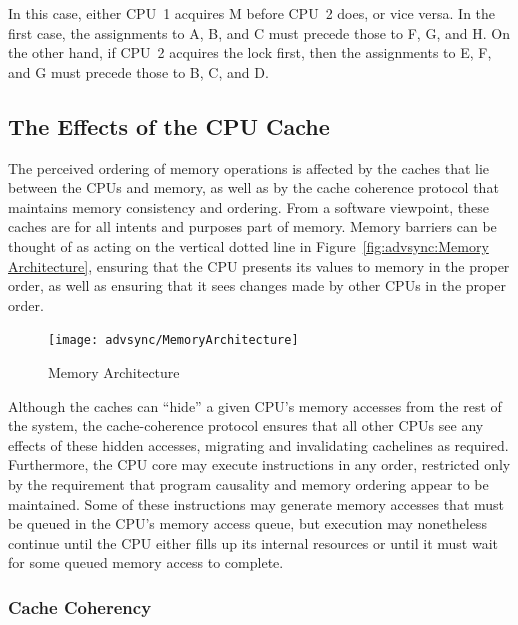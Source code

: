 \begin{enumerate}
In this case, either CPU~1 acquires M before CPU~2 does, or vice versa.
In the first case, the assignments to A, B, and C must precede
those to F, G, and H.
On the other hand, if CPU~2 acquires the lock first, then the
assignments to E, F, and G must precede those to B, C, and D.
\fi

\subsection{The Effects of the CPU Cache}
\label{sec:advsync:The Effects of the CPU Cache}

The perceived ordering of memory operations is affected by the caches
that lie between the CPUs and memory, as well as by the cache coherence
protocol that maintains memory consistency and ordering.
From a software viewpoint, these caches are for all intents and purposes
part of memory.
Memory barriers can be thought of as acting on the vertical dotted line in
Figure~\ref{fig:advsync:Memory Architecture}, ensuring that the CPU
presents its values to memory in the proper order, as well as ensuring
that it sees changes made by other CPUs in the proper order.

\begin{figure}[htb]
\begin{center}
\texttt{[image: advsync/MemoryArchitecture]}
\end{center}
\caption{Memory Architecture}
\end{figure}

Although the caches can ``hide'' a given CPU's memory accesses from the rest of
the system, the cache-coherence protocol ensures that all other CPUs see
any effects of these hidden accesses, migrating and invalidating cachelines
as required.
Furthermore, the CPU core may execute instructions in any order, restricted
only by the requirement that program causality and memory ordering
appear to be maintained.
Some of these instructions may generate memory accesses that must be queued
in the CPU's memory access queue, but execution may nonetheless continue
until the CPU either fills up its internal resources or until it must
wait for some queued memory access to complete.

\subsubsection{Cache Coherency}
\label{sec:advsync:Cache Coherency}


\end{enumerate}
